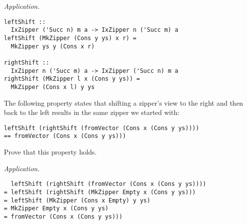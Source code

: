\begin{parts}
\begin{subparts}
    \begin{solution}
        \emph{Application.}
\begin{verbatim}
leftShift :: 
  IxZipper ('Succ n) m a -> IxZipper n ('Succ m) a
leftShift (MkZipper (Cons y ys) x r) = 
  MkZipper ys y (Cons x r)

rightShift :: 
  IxZipper n ('Succ m) a -> IxZipper ('Succ n) m a
rightShift (MkZipper l x (Cons y ys)) = 
  MkZipper (Cons x l) y ys
\end{verbatim}
    \end{solution}

    \subpart[2] The following property states that shifting a zipper's view to the right and then back to the left results in the same zipper we started with:
    \begin{center}
        \texttt{\small leftShift (rightShift (fromVector (Cons x (Cons y ys))))}\\
        \texttt{\small == fromVector (Cons x (Cons y ys)))}
    \end{center}
    Prove that this property holds. \droppoints

    \begin{solution}
        \emph{Application.}
\begin{verbatim}
  leftShift (rightShift (fromVector (Cons x (Cons y ys))))
= leftShift (rightShift (MkZipper Empty x (Cons y ys)))
= leftShift (MkZipper (Cons x Empty) y ys)
= MkZipper Empty x (Cons y ys)
= fromVector (Cons x (Cons y ys)))
\end{verbatim}
    \end{solution}
\end{subparts}

\end{parts}
